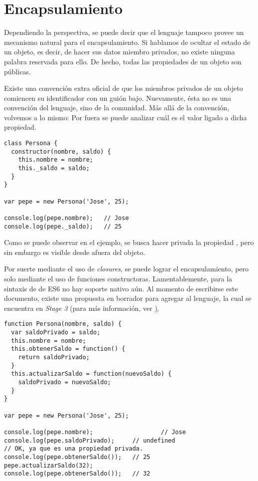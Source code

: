 \section{Encapsulamiento}

Dependiendo la perspectiva, se puede decir que el lenguaje tampoco provee un mecanismo natural para el encapsulamiento. Si hablamos de ocultar el estado de un objeto, es decir, de hacer sus datos miembro privados, no existe ninguna palabra reservada para ello. De hecho, todas las propiedades de un objeto son públicas.

Existe una convención extra oficial de que los miembros privados de un objeto comiencen su identificador con un guión bajo. Nuevamente, ésta no es una convención del lenguaje, sino de la comunidad. Más allá de la convención, volvemos a lo mismo: Por fuera se puede analizar cuál es el valor ligado a dicha propiedad.

\begin{lstlisting}[title={Descubriendo variables "`privadas"'}]
class Persona {
  constructor(nombre, saldo) {
    this.nombre = nombre;
    this._saldo = saldo;
  }
}

var pepe = new Persona('Jose', 25);

console.log(pepe.nombre);	// Jose
console.log(pepe._saldo);	// 25
\end{lstlisting}

Como se puede observar en el ejemplo, se busca hacer privada la propiedad , pero sin embargo es visible desde afuera del objeto.

Por suerte mediante el uso de \textit{closures}, se puede lograr el encapsulamiento, pero solo mediante el uso de funciones constructoras. Lamentablemente, para la sintaxis de  de ES6 no hay soporte nativo aún. Al momento de escribirse este documento, existe una propuesta en borrador para agregar al lenguaje, la cual se encuentra en \textit{Stage 3} (para más información, ver \href{https://github.com/tc39/proposal-class-fields#private-fields}).

\begin{lstlisting}[title={Alcanzando variables privadas mediante closures}]
function Persona(nombre, saldo) {
  var saldoPrivado = saldo;
  this.nombre = nombre;
  this.obtenerSaldo = function() {
    return saldoPrivado;
  }
  this.actualizarSaldo = function(nuevoSaldo) {
    saldoPrivado = nuevoSaldo;
  }
}

var pepe = new Persona('Jose', 25);

console.log(pepe.nombre);					// Jose
console.log(pepe.saldoPrivado);		// undefined
// OK, ya que es una propiedad privada.
console.log(pepe.obtenerSaldo());	// 25
pepe.actualizarSaldo(32);
console.log(pepe.obtenerSaldo());	// 32
\end{lstlisting}


